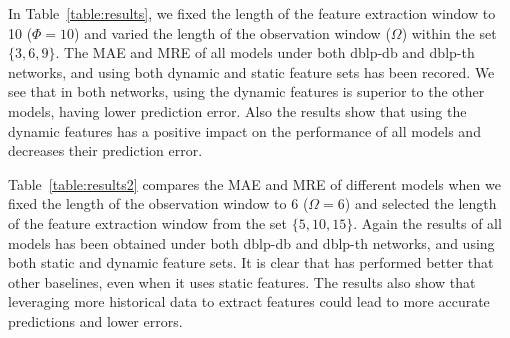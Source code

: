 In Table~\ref{table:results}, we fixed the length of the feature extraction window to 10 ($\Phi=10$) and varied the length of the observation window ($\Omega$) within the set $\{3,6,9\}$. The MAE and MRE of all models under both dblp-db and dblp-th networks, and using both dynamic and static feature sets has been recored. We see that in both networks, \npglm using the dynamic features is superior to the other models, having lower prediction error. Also the results show that using the dynamic features has a positive impact on the performance of all models and decreases their prediction error.

Table~\ref{table:results2} compares the MAE and MRE of different models when we fixed the length of the observation window to 6 ($\Omega=6$) and selected the length of the feature extraction window from the set $\{5,10,15\}$. Again the results of all models has been obtained under both dblp-db and dblp-th networks, and using both static and dynamic feature sets. It is clear that \npglm has performed better that other baselines, even when it uses static features. The results also show that leveraging more historical data to extract features could lead to more accurate predictions and lower errors.


